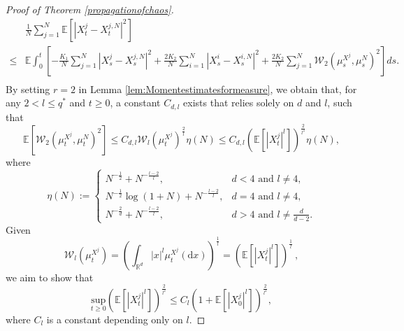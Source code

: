 \documentclass[12pt]{article}
\numberwithin{equation}{section}
\begin{document}
\begin{proof}[Proof of Theorem \ref{propagationofchaos}]
\begin{equation}
\begin{aligned}
&\tfrac{1}{N}\sum_{j=1}^N{\mathbb{E} \left[ \left| X_{t}^{j}-X_{t}^{j,N} \right|^2 \right]}\\
\leq&\mathbb{E}   \int_0^t\left[ {-}\tfrac{K_1}{N}\sum_{j=1}^N{\left| X_{s}^{j}-X_{s}^{j,N} \right|^2}+\tfrac{2K_2}{N}\sum_{i=1}^N{\left| X_{s}^{i}-X_{s}^{i,N} \right|^2}+\tfrac{2K_2}{N}\sum_{j=1}^N{\mathcal{W} _2\left( \mu _{s}^{X^j},\mu _{s}^{N} \right) ^2}  \right]ds .\\
\end{aligned}
\end{equation}
By setting $r=2$ in Lemma \ref{lem:Momentestimatesformeasure}, we obtain that, for any $2<l\leq q^*$ and $t \geq 0$, a constant $ C_{d,l} $ exists that relies solely on $ d $ and $ l $, such that
\begin{equation}\tag{5.7}\label{3.15}
\mathbb{E}\left[\mathcal{W}_2\left(\mu_t^{X^j}, \mu_t^N\right)^2\right] \leq C_{d, {l}}\mathcal{W} _{l}\left( \mu _{t}^{X^j} \right) ^{\frac{2}{l}} \eta\left(N\right)\leq C_{d, {l}}\left(\mathbb{E}\left[\left|X^j_t\right|^{l}\right]\right)^{\frac{2}{l^2}} \eta \left(N\right),
\end{equation}
where 
\begin{equation}\tag{5.8}\label{3.16}
\eta \left(N\right):= \begin{cases}N^{-\frac{1}{2}}+N^{-\frac{{l}-2}{l}}, & d<4 \text { and } {l} \neq 4, \\ N^{-\frac{1}{2}} \log \left(1+N\right)+N^{-\frac{{l}-2}{l}}, & d=4 \text { and } {l} \neq 4, \\ N^{-\frac{2}{d}}+N^{-\frac{{l}-2}{{l}}}, & d>4 \text { and } {l} \neq \frac{d}{d-2}.\end{cases}
\end{equation}
Given 
\begin{equation}\tag{5.9}\label{3.14}
\mathcal{W} _{l}\left( \mu _{t}^{X^j} \right) =\left( \int_{\mathbb{R} ^d}\left|x\right|^{l}\mu _{t}^{X^j}\left(\mathrm{d}x\right) \right) ^{\frac{1}{l}}=\left( \mathbb{E}\left[ \left|X_{t}^{j}\right|^{l} \right] \right) ^{\frac{1}{l}} \,, 
\end{equation} 
we aim to show that
\begin{equation}\tag{5.10}\label{3.17}
\underset{t\geqslant 0}{\mathrm{sup}}\left(\mathbb{E}\left[\left|X^j_t\right|^{l}\right]\right)^{\frac{2}{l^2}} \leq C_{l}\left(1+\mathbb{E}\left[\left|X^j_0\right|^{l}\right]\right)^{\frac{2}{{l^2}}},
\end{equation}
where $C_{{l}}$ is a constant depending only on $ {l}$.

\end{proof}
\end{document}
